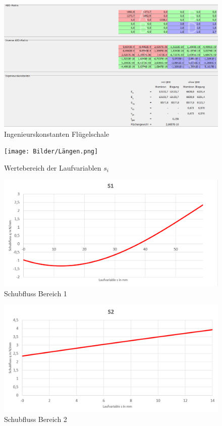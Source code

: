 \begin{figure}[h]
	\includegraphics[width=1.0\textwidth]{Bilder/Konstanten Haut.png}
	\caption{Ingenieurskonstanten Flügelschale}
	\label{fig:Ingenieurskonstanten Haut}
\end{figure}
\begin{figure}[h]
	\centering
	\texttt{[image: Bilder/Längen.png]}
	\caption{Wertebereich der Laufvariablen $s_i$}
	\label{fig:LaengenS}
\end{figure}
\begin{figure}[h]
	\includegraphics[width=1.0\textwidth]{Bilder/S1.png}
	\caption{Schubfluss Bereich 1}
	\label{fig:S1}
\end{figure}
\begin{figure}[h]
	\includegraphics[width=1.0\textwidth]{Bilder/S2.png}
	\caption{Schubfluss Bereich 2}
\end{figure}
